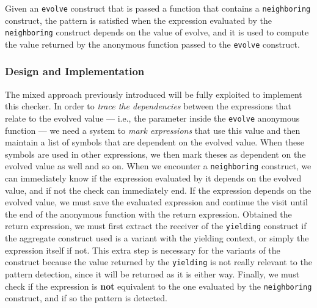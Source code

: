 \documentclass[12pt,a4paper,openright,twoside]{book}
\begin{document}
Given an \lstinline{evolve} construct that is passed a function that contains a
\lstinline{neighboring} construct, the pattern is satisfied when the expression
evaluated by the \lstinline{neighboring} construct depends on the value of
evolve, and it is used to compute the value returned by the anonymous function
passed to the \lstinline{evolve} construct.

\subsubsection{Design and Implementation}

The mixed approach previously introduced will be fully exploited to implement
this checker. In order to \emph{trace the dependencies} between the expressions
that relate to the evolved value --- i.e., the parameter inside the
\lstinline{evolve} anonymous function --- we need a system to \emph{mark
expressions} that use this value and then maintain a list of symbols that are
dependent on the evolved value. 
%
When these symbols are used in other expressions, we then mark theses as
dependent on the evolved value as well and so on. When we encounter a
\lstinline{neighboring} construct, we can immediately know if the expression
evaluated by it depends on the evolved value, and if not the check can
immediately end.
%
If the expression depends on the evolved value, we must save the evaluated
expression and continue the visit until the end of the anonymous function with
the return expression. Obtained the return expression, we must first extract the 
receiver of the \lstinline{yielding} construct if the aggregate construct used 
is a variant with the yielding context, or simply the expression itself if not. 
%
This extra step is necessary for the variants of the construct because the 
value returned by the \lstinline{yielding} is not really relevant to the pattern
detection, since it will be returned as it is either way. 
%
Finally, we must check if the expression is \textbf{not} equivalent to the one
evaluated by the \lstinline{neighboring} construct, and if so the pattern is
detected. 
\end{document}
